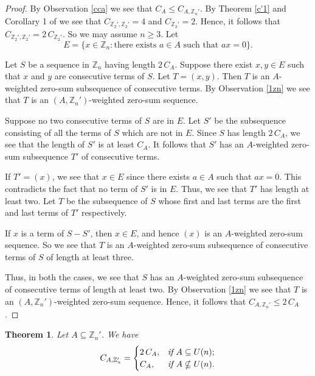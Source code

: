 \documentclass{article}[11pt]
\newtheorem{theorem}{Theorem}[section]
\theoremstyle{definition}
\begin{document}
\begin{proof}
By Observation \ref{cca} we see that $C_A\leq C_{A,\mathbb Z_n'}$. By Theorem \ref{c'1} and Corollary 1 of \cite{SKS1} we see that $C_{\mathbb Z_2',\mathbb Z_2'}=4$ and $C_{\mathbb Z_2'}=2$. Hence, it follows that $C_{\mathbb Z_2',\mathbb Z_2'}=2\,C_{\mathbb Z_2'}$. So we may assume $n\geq 3$. Let
\[E=\Big\{x\in \mathbb Z_n:\text{there exists }a\in A\text{ such that }ax=0\Big\}.\]

Let $S$ be a sequence in $\mathbb Z_n$ having length $2\,C_A$. Suppose there exist $x,y\in E$ such that $x$ and $y$ are consecutive terms of $S$. Let $T=(x,y)$. Then $T$ is an $A$-weighted zero-sum subsequence of consecutive terms. By Observation \ref{1zn} we see that $T$ is an $(A,\mathbb Z_n')$-weighted zero-sum sequence.

Suppose no two consecutive terms of $S$ are in $E$. Let $S'$ be the subsequence consisting of all the terms of $S$ which are not in $E$. Since $S$ has length $2\,C_A$, we see that the length of $S'$ is at least $C_A$. It follows that $S'$ has an $A$-weighted zero-sum subsequence $T'$ of consecutive terms.

If $T'=(x)$, we see that $x\in E$ since there exists $a\in A$ such that $ax=0$. This contradicts the fact that no term of $S'$ is in $E$. Thus, we see that $T'$ has length at least two. Let $T$ be the subsequence of $S$ whose first and last terms are the first and last terms of $T'$ respectively.

If $x$ is a term of $S-S'$, then $x\in E$, and hence $(x)$ is an $A$-weighted zero-sum sequence. So we see that $T$ is an $A$-weighted zero-sum subsequence of consecutive terms of $S$ of length at least three.

Thus, in both the cases, we see that $S$ has an $A$-weighted zero-sum subsequence of consecutive terms of length at least two. By Observation \ref{1zn} we see that $T$ is an $(A,\mathbb Z_n')$-weighted zero-sum sequence. Hence, it follows that $C_{A,\mathbb Z_n'}\leq 2\,C_A$.
\end{proof}


\begin{theorem}\label{can}
Let $A\subseteq \mathbb Z_n'$. We have
\[C_{A,\mathbb Z_n'}=
\begin{cases}
2\,C_A, & \emph {if }A\subseteq U(n); \\
C_A, & \emph{if }A\nsubseteq U(n).
\end{cases}\]
\end{theorem}
\end{document}
